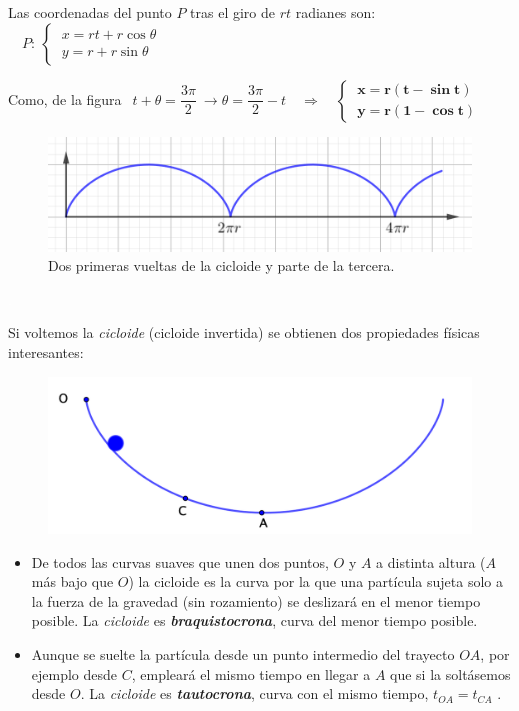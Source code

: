 Las coordenadas del punto $P$ tras el giro de $rt$ radianes son:
$\quad P:\ \begin{cases} \ x=rt+r\cos \theta \\ \ y=r+r\sin \theta \end{cases}$
 
Como, de la figura $\ \ t+\theta=\dfrac{3\pi}2 \ \to \theta=\dfrac {3\pi}2-t \quad \Rightarrow \quad  \begin{cases} \ \boldsymbol{x=r(t-\sin t)} \\ \ \boldsymbol{y=r(1-\cos t)} \end{cases}$

\begin{figure}[H]
	\centering
	\includegraphics[width=.6\textwidth]{img-polares/polares08.png}
	\caption*{Dos primeras vueltas de la cicloide y parte de la tercera.}
	\end{figure}

\color{gris}

\vspace{5mm}
\begin{multicols}{2}
\textcolor{white}{.}\vspace{-5mm}

Si voltemos la \emph{cicloide} (cicloide invertida) se obtienen dos propiedades físicas interesantes:

\begin{figure}[H]
	\centering
	\includegraphics[width=.3\textwidth]{img-polares/polares09.png}
	\end{figure}
\end{multicols}
	
\begin{itemize}
\item De todos las curvas suaves que unen dos puntos, $O$ y $A$ a distinta altura ($A$ más bajo que $O$) la cicloide es la curva por la que una partícula sujeta solo a la fuerza de la gravedad (sin rozamiento) se deslizará en el menor tiempo posible. La \emph{cicloide} es \emph{\textbf{braquistocrona}}, curva del menor tiempo posible.
\item Aunque se suelte la partícula desde un punto intermedio del trayecto $OA$, por ejemplo desde $C$, empleará el mismo tiempo en llegar a $A$ que si la soltásemos desde $O$.	La \emph{cicloide} es \emph{\textbf{tautocrona}}, curva con el mismo tiempo, $t_{OA}=t_{CA}$ .
\end{itemize}


